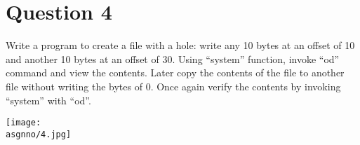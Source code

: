 \documentclass[main.tex]{subfiles}
\begin{document}
\section{Question 4}

Write a program to create a file with a hole: write any 10 bytes at an offset of
10 and another 10 bytes at an offset of 30. Using “system” function, invoke “od”
command and view the contents. Later copy the contents of the file to another
file without writing the bytes of 0. Once again verify the contents by invoking
“system” with “od”.


\centering\texttt{[image: \\asgnno/4.jpg]}
\end{document}
